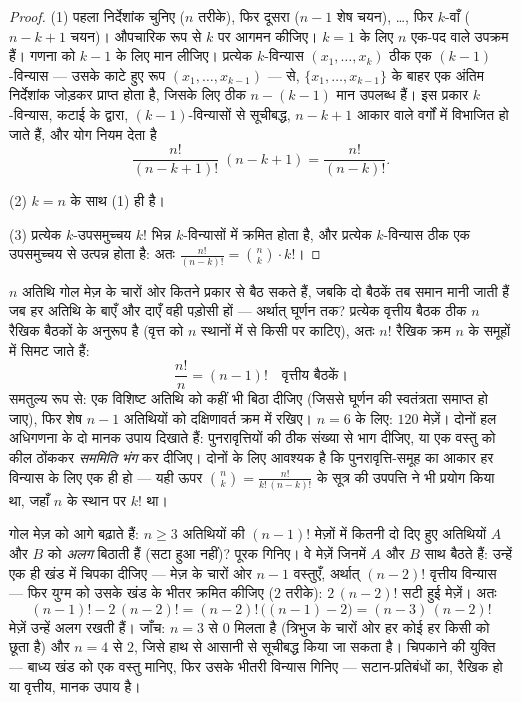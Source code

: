 \begin{proof}
(1) पहला निर्देशांक चुनिए ($n$ तरीके), फिर दूसरा ($n - 1$ शेष चयन), \dots,
फिर $k$-वाँ ($n - k + 1$ चयन)। औपचारिक रूप से $k$ पर आगमन कीजिए। $k = 1$ के
लिए $n$ एक-पद वाले  उपक्रम हैं। गणना को $k - 1$ के लिए मान लीजिए।
प्रत्येक $k$-विन्यास $(x_1, \dots, x_k)$ ठीक एक $(k-1)$-विन्यास --- उसके
काटे हुए रूप $(x_1, \dots, x_{k-1})$ --- से, $\{x_1, \dots, x_{k-1}\}$ के
बाहर एक अंतिम निर्देशांक जोड़कर प्राप्त होता है, जिसके लिए ठीक $n - (k - 1)$
मान उपलब्ध हैं। इस प्रकार $k$-विन्यास, कटाई के द्वारा, $(k-1)$-विन्यासों से
सूचीबद्ध, $n - k + 1$ आकार वाले वर्गों में विभाजित हो जाते हैं, और योग नियम
देता है
\[
\frac{n!}{(n-k+1)!}\;(n - k + 1) = \frac{n!}{(n-k)!} .
\]

(2) $k = n$ के साथ (1) ही है।

(3) प्रत्येक $k$-उपसमुच्चय $k!$ भिन्न $k$-विन्यासों में क्रमित होता है, और
प्रत्येक $k$-विन्यास ठीक एक उपसमुच्चय से उत्पन्न होता है: अतः
$\frac{n!}{(n-k)!} = \binom nk \cdot k!$।
\end{proof}

\begin{example}[गोल मेज़: सममिति से भाग देना]\label{ex:b1:counting:roundtable}
$n$ अतिथि गोल मेज़ के चारों ओर कितने प्रकार से बैठ सकते हैं, जबकि दो बैठकें
तब समान मानी जाती हैं जब हर अतिथि के बाएँ और दाएँ वही पड़ोसी हों --- अर्थात्
घूर्णन तक? प्रत्येक वृत्तीय बैठक ठीक $n$ रैखिक बैठकों के अनुरूप है (वृत्त को
$n$ स्थानों में से किसी पर काटिए), अतः $n!$ रैखिक क्रम $n$ के समूहों में
सिमट जाते हैं:
\[
\frac{n!}{n} = (n-1)! \quad\text{वृत्तीय बैठकें।}
\]
समतुल्य रूप से: एक विशिष्ट अतिथि को कहीं भी बिठा दीजिए (जिससे घूर्णन की
स्वतंत्रता समाप्त हो जाए), फिर शेष $n - 1$ अतिथियों को दक्षिणावर्त क्रम में
रखिए। $n = 6$ के लिए: $120$ मेज़ें। दोनों हल अधिगणना के दो मानक उपाय दिखाते
हैं: पुनरावृत्तियों की ठीक संख्या से भाग दीजिए, या एक वस्तु को कील ठोंककर
\emph{सममिति भंग} कर दीजिए। दोनों के लिए आवश्यक है कि पुनरावृत्ति-समूह का
आकार हर विन्यास के लिए एक ही हो --- यही ऊपर $\binom nk =
\frac{n!}{k!\,(n-k)!}$ के सूत्र की उपपत्ति ने भी प्रयोग किया था, जहाँ $n$ के
स्थान पर $k!$ था।
\end{example}

\begin{example}[एक प्रतिबंध जोड़ना]\label{ex:b1:counting:constraint}
गोल मेज़ को आगे बढ़ाते हैं: $n \geq 3$ अतिथियों की $(n-1)!$ मेज़ों में कितनी
दो दिए हुए अतिथियों $A$ और $B$ को \emph{अलग} बिठाती हैं (सटा हुआ नहीं)? पूरक
गिनिए। वे मेज़ें जिनमें $A$ और $B$ साथ बैठते हैं: उन्हें एक ही खंड में चिपका
दीजिए --- मेज़ के चारों ओर $n - 1$ वस्तुएँ, अर्थात् $(n-2)!$ वृत्तीय विन्यास
--- फिर युग्म को उसके खंड के भीतर क्रमित कीजिए ($2$ तरीके): $2\,(n-2)!$ सटी
हुई मेज़ें। अतः
\[
(n-1)! - 2\,(n-2)! = (n-2)!\,\bigl((n - 1) - 2\bigr)
= (n-3)\,(n-2)!
\]
मेज़ें उन्हें अलग रखती हैं। जाँच: $n = 3$ से $0$ मिलता है (त्रिभुज के चारों
ओर हर कोई हर किसी को छूता है) और $n = 4$ से $2$, जिसे हाथ से आसानी से
सूचीबद्ध किया जा सकता है। चिपकाने की युक्ति --- बाध्य खंड को एक वस्तु मानिए,
फिर उसके भीतरी विन्यास गिनिए --- सटान-प्रतिबंधों का, रैखिक हो या वृत्तीय,
मानक उपाय है।
\end{example}

